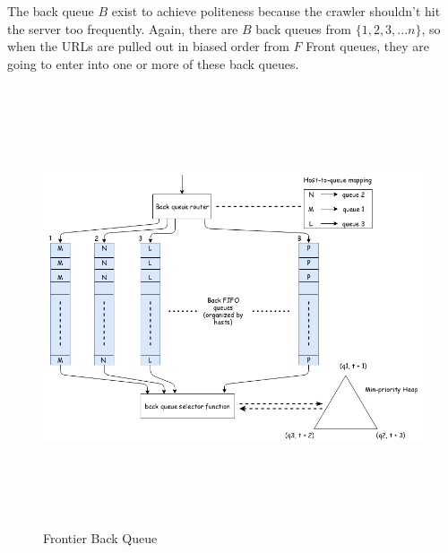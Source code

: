 \noindent
%
\pagebreak

\noindent
The back queue $B$ exist to achieve politeness because the crawler shouldn't hit the server too frequently.
Again, there are $B$ back queues from $\{1,2,3,...n\}$, so when the URLs are pulled out in biased order from $F$ Front queues, they are going to enter into one or more of these back queues. 

\begin{figure}[h!]
  \centering
  \includegraphics[width=15cm,height=13cm,keepaspectratio]{../media/crawler/b-queue.png}
  \caption{Frontier Back Queue \cite{mercator}}
  \label{fig:bqueue}
\end{figure}


